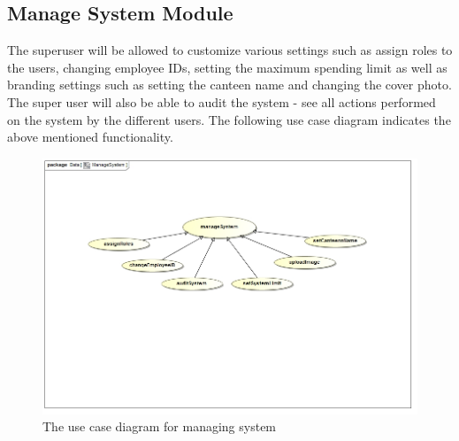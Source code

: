 \documentclass[a4paper,12pt]{report}
\begin{document}
\subsection{Manage System Module}

 The superuser will be allowed to customize various settings such as assign roles to the users, changing employee IDs, setting the maximum spending limit as well as branding settings such as setting the canteen name and changing the cover photo. The super user will also be able to audit the system - see all actions performed on the system by the different users. The following use case diagram indicates the above mentioned functionality.

\begin{figure}[H]
  \centering
    \includegraphics[width=1.0\textwidth]{../images/ManageSystem.jpg}
    \caption{The use case diagram for managing system} 
\end{figure}
\end{document}
